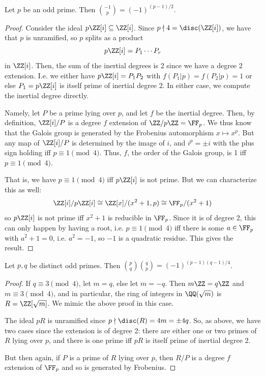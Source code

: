 \begin{thm} Let $p$ be an odd prime. Then ${-1 \choose p} = (-1)^{(p-1)/2}$. \end{thm}
\begin{proof}
	Consider the ideal $p\ZZ[i] \subseteq \ZZ[i]$. Since $p \nmid 4 = \disc(\ZZ[i])$, we have that $p$ is unramified, so $p$ splits as a product
	\[ p\ZZ[i] = P_1\cdots P_r \]
	in $\ZZ[i]$. Then, the sum of the inertial degrees is 2 since we have a degree 2 extension. I.e. we either have $p\ZZ[i] = P_1P_2$ with $f(P_1|p) = f(P_2|p) = 1$ or else $P_1 = p\ZZ[i]$ is itself prime of inertial degree 2. In either case, we compute the inertial degree directly.
	
	Namely, let $P$ be a prime lying over $p$, and let $f$ be the inertial degree. Then, by definition, $\ZZ[i]/P$ is a degree $f$ extension of $\ZZ/p\ZZ = \FF_p$. We thus know that the Galois group is generated by the Frobenius automorphism $x \mapsto x^p$. But any map of $\ZZ[i]/P$ is determined by the image of $i$, and $i^p = \pm i$ with the plus sign holding iff $p \equiv 1 \pmod{4}$. Thus, $f$, the order of the Galois group, is 1 iff $p \equiv 1 \pmod{4}$.
	
	That is, we have $p \equiv 1 \pmod{4}$ iff $p\ZZ[i]$ is not prime. But we can characterize this as well:
	\[ \ZZ[i]/p\ZZ[i] \cong \ZZ[x]/(x^2+1,p) \cong \FF_p/(x^2+1) \]
	so $p\ZZ[i]$ is not prime iff $x^2+1$ is reducible in $\FF_p$. Since it is of degree 2, this can only happen by having a root, i.e. $p \equiv 1 \pmod{4}$ iff there is some $a \in \FF_p$ with $a^2+1=0$, i.e. $a^2=-1$, so $-1$ is a quadratic residue. This gives the result.
\end{proof}

\begin{thm} Let $p,q$ be distinct odd primes. Then ${p \choose q}{q \choose p} = (-1)^{(p-1)(q-1)/4}$. \end{thm}
\begin{proof}
	If $q \equiv 3 \pmod{4}$, let $m = q$, else let $m = -q$. Then $m\ZZ = q\ZZ$ and $m \equiv 3 \pmod{4}$, and in particular, the ring of integers in $\QQ(\sqrt{m})$ is $R = \ZZ[\sqrt{m}]$. We mimic the above proof in this case.
	
	The ideal $pR$ is unramified since $p \nmid \disc(R) = 4m = \pm 4q$. So, as above, we have two cases since the extension is of degree 2: there are either one or two primes of $R$ lying over $p$, and there is one prime iff $pR$ is itself prime of inertial degree $2$.
	
	But then again, if $P$ is a prime of $R$ lying over $p$, then $R/P$ is a degree $f$ extension of $\FF_p$ and so is generated by Frobenius. 
\end{proof}
